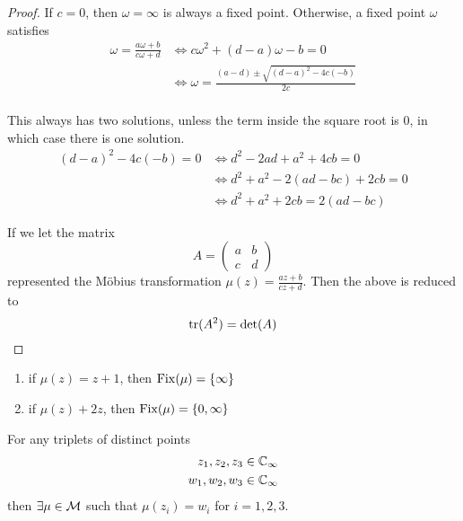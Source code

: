 \documentclass{article}
\begin{document}
\begin{proof}
    If $c = 0$, then $\omega = \infty$ is always a fixed point. Otherwise, a fixed point $\omega$ satisfies
    \begin{align*}
        \omega = \frac{a\omega + b}{c\omega + d} &\Leftrightarrow c \omega^2 + (d - a)\omega - b = 0 \\
        &\Leftrightarrow \omega = \frac{(a - d) \pm \sqrt{(d-a)^2 - 4c(-b)}}{2c} \\
    \end{align*}

    This always has two solutions, unless the term inside the square root is $0$, in which case there is one solution.
    \begin{align*}
        (d-a)^2 - 4c(-b) = 0 &\Leftrightarrow d^2 -2ad + a^2 + 4cb = 0 \\
        &\Leftrightarrow d^2 + a^2 -2(ad - bc) + 2cb = 0 \\
        &\Leftrightarrow d^2 + a^2 + 2cb = 2(ad - bc)
    \end{align*}

    If we let the matrix
    \[
        A = \begin{pmatrix}
            a & b \\
            c & d
        \end{pmatrix}
    \]
    represented the M\"obius transformation $\mu(z) = \frac{az + b}{cz + d}$. Then the above is reduced to
    \[
        \operatorname{tr}(A^2) = \det(A)
    \]
\end{proof}

\begin{eg}\leavevmode
    \begin{enumerate}
        \item if $\mu(z) = z + 1$, then $\operatorname{Fix}(\mu) = \{ \infty \}$
        \item if $\mu(z) + 2z$, then $\operatorname{Fix}(\mu) = \{0, \infty\}$
    \end{enumerate}
\end{eg}

\begin{lemma}
    For any triplets of distinct points
    \begin{align*}
        z_1, z_2, z_3 \in \mathbb{C}_\infty \\
        w_1, w_2, w_3 \in \mathbb{C}_\infty
    \end{align*}
    then $\exists \mu \in \mathcal{M}$ such that $\mu(z_i) = w_i$ for $i = 1 , 2, 3$.
\end{lemma}
\end{document}

